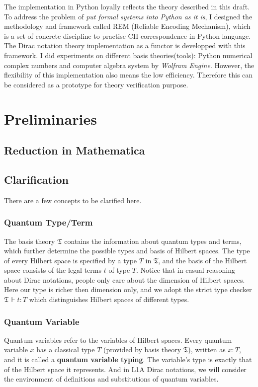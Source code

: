 The implementation in Python loyally reflects the theory described in this draft. To address the problem of \textit{put formal systems into Python as it is}, I designed the methodology and framework called REM (Reliable Encoding Mechanism), which is a set of concrete discipline to practise CH-correspondence in Python language. The Dirac notation theory implementation as a functor is developped with this framework. I did experiments on different basis theories(tools): Python numerical complex numbers and computer algebra system by \textit{Wolfram Engine}.
However, the flexibility of this implementation also means the low efficiency. Therefore this can be considered as a prototype for theory verification purpose.


\section{Preliminaries}

\subsection{Reduction in Mathematica}

\subsection{Clarification}
There are a few concepts to be clarified here.

\subsubsection*{Quantum Type/Term}
The basis theory $\mathfrak{T}$ contains the information about quantum types and terms, which further determine the possible types and basis of Hilbert spaces. The type of every Hilbert space is specified by a type $T$ in $\mathfrak{T}$, and the basis of the Hilbert space consists of the legal terms $t$ of type $T$. Notice that in casual reasoning about Dirac notations, people only care about the dimension of Hilbert spaces. Here our type is richer then dimension only, and we adopt the strict type checker $\mathfrak{T} \Vdash t : T$ which distinguishes Hilbert spaces of different types.


\subsubsection*{Quantum Variable}
Quantum variables refer to the variables of Hilbert spaces. Every quantum variable $x$ has a classical type $T$ (provided by basis theory $\mathfrak{T}$), written as $x : T$, and it is called a \textbf{quantum variable typing}. The variable's type is exactly that of the Hilbert space it represents. And in L1A Dirac notations, we will consider the environment of definitions and substitutions of quantum variables.

